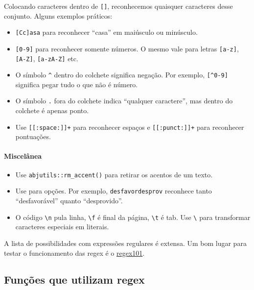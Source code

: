 \documentclass[
]{book}
\begin{document}
Colocando caracteres dentro de \texttt{{[}{]}}, reconhecemos quaisquer caracteres desse conjunto. Alguns exemplos práticos:

\begin{itemize}
\item
  \texttt{{[}Cc{]}asa} para reconhecer ``casa'' em maiúsculo ou minúsculo.
\item
  \texttt{{[}0-9{]}} para reconhecer somente números. O mesmo vale para letras \texttt{{[}a-z{]}}, \texttt{{[}A-Z{]}}, \texttt{{[}a-zA-Z{]}} etc.
\item
  O símbolo \texttt{\^{}} dentro do colchete significa negação. Por exemplo, \texttt{{[}\^{}0-9{]}} significa pegar tudo o que não é número.
\item
  O símbolo \texttt{.} fora do colchete indica ``qualquer caractere'', mas dentro do colchete é apenas ponto.
\item
  Use \texttt{{[}{[}:space:{]}{]}+} para reconhecer espaços e \texttt{{[}{[}:punct:{]}{]}+} para reconhecer pontuações.
\end{itemize}

\hypertarget{misceluxe2nea}{%
\paragraph*{Miscelânea}\label{misceluxe2nea}}

\begin{itemize}
\item
  Use \texttt{abjutils::rm\_accent()} para retirar os acentos de um texto.
\item
  Use \texttt{\textbar{}} para opções. Por exemplo, \texttt{desfavor\textbar{}desprov} reconhece tanto ``desfavorável'' quanto ``desprovido''.
\item
  O código \texttt{\textbackslash{}n} pula linha, \texttt{\textbackslash{}f} é final da página, \texttt{\textbackslash{}t} é tab. Use \texttt{\textbackslash{}} para transformar caracteres especiais em literais.
\end{itemize}

A lista de possibilidades com expressões regulares é extensa.
Um bom lugar para testar o funcionamento das regex é o \href{https://regex101.com/}{regex101}.

\hypertarget{funuxe7uxf5es-que-utilizam-regex}{%
\subsection{Funções que utilizam regex}\label{funuxe7uxf5es-que-utilizam-regex}}
\end{document}
